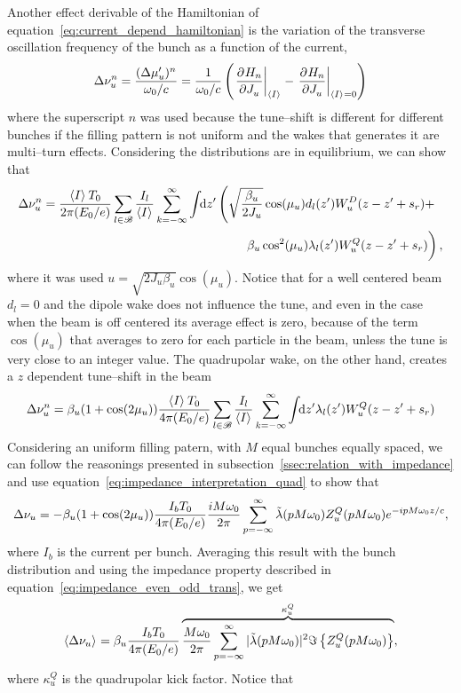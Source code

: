     Another effect derivable of the Hamiltonian of equation~\eqref{eq:current_depend_hamiltonian} is the variation of the transverse oscillation frequency of the bunch as a function of the current,
    \begin{align}
        \Delta\nu_u^n = \frac{(\Delta\mu'_u)^n}{\omega_0/c} = \frac{1}{\omega_0/c}\left(\left.\frac{\partial^{{}}H_n}{\partial J_u^{{}}}\right|_{\left\langle I \right\rangle_{{}}} - \left.\frac{\partial^{{}}H_n}{\partial J_u^{{}}}\right|_{\left\langle I \right\rangle_{{}}=0}\right)
    \end{align}
    where the superscript $n$ was used because the tune--shift is different for different bunches if the filling pattern is not uniform and the wakes that generates it are multi--turn effects. Considering the distributions are in equilibrium, we can show that
    \begin{align}
        \Delta\nu_u^n = \frac{\average{I}T_0}{2\pi(E_0/e)}
        \sum_{l\in\mathscr{B}}\frac{I_l}{\average{I}}\sum_{k=-\infty}^\infty\udefint{z'}{
        &\left(\sqrt{\frac{\beta_u}{2J_u}}\cos(\mu_u)d_l(z') W^D_u(z-z' + s_r) +\right.\\
        &\left.\phantom{\sqrt{\frac{1_1}{1_1}}}\beta_u\cos^2(\mu_u)\lambda_l(z') W^Q_u(z-z' + s_r)\right)},
    \end{align}
    where it was used $u = \sqrt{2J_u\beta_u}\cos(\mu_u)$. Notice that for a well centered beam $d_l=0$ and the dipole wake does not influence the tune, and even in the case when the beam is off centered its average effect is zero, because of the term $\cos(\mu_u)$ that averages to zero for each particle in the beam, unless the tune is very close to an integer value. The quadrupolar wake, on the other hand, creates a $z$ dependent tune--shift in the beam
    \begin{align}
        \Delta\nu_u^n = \beta_u(1+\cos(2\mu_u))\frac{\left\langle I \right\rangle_{{}}T_0}{4\pi(E_0/e)}
        \sum_{l\in\mathscr{B}}\frac{I_l}{\left\langle I \right\rangle_{{}}}\sum_{k=-\infty}^\infty\int\!\!\text{d}z' 
        \lambda_l(z') W^Q_u(z-z' + s_r)
    \end{align}
    Considering an uniform filling patern, with $M$ equal bunches equally spaced, we can follow the reasonings presented in subsection~\ref{ssec:relation_with_impedance} and use equation~\eqref{eq:impedance_interpretation_quad} to show that
    \begin{align}
        \Delta\nu_u = -\beta_u(1+\cos(2\mu_u))\frac{I_bT_0}{4\pi(E_0/e)}
        \frac{iM\omega_0}{2\pi} \sum_{p=-\infty}^\infty \tilde{\lambda}(pM\omega_0)Z^Q_u(pM\omega_0)e^{-ipM\omega_0 z/c},
    \end{align}
    where $I_b$ is the current per bunch. Averaging this result with the bunch distribution and using the impedance property described in equation~\eqref{eq:impedance_even_odd_trans}, we get
    \begin{align}\label{eq:incoherent_tune_shift}
        \left\langle \Delta\nu_u \right\rangle_{{}} = \beta_u\frac{I_bT_0}{4\pi(E_0/e)}
        \overbrace{
        \frac{M\omega_0}{2\pi} \sum_{p=-\infty}^\infty |\tilde{\lambda}(pM\omega_0)|^2\Im\left\{Z^Q_u(pM\omega_0)\right\}}^{\kappa^Q_u},
    \end{align}
    where $\kappa^Q_u$ is the quadrupolar kick factor. Notice that

